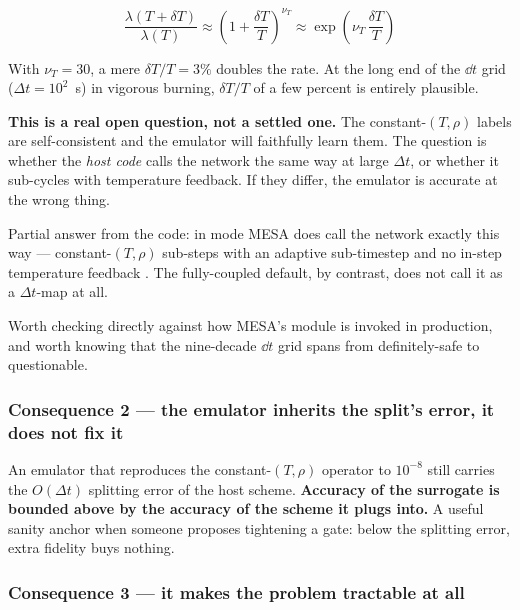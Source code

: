 \begin{equation*}
\frac{\lambda(T+\delta T)}{\lambda(T)}
  \approx \left(1 + \frac{\delta T}{T}\right)^{\!\nu_T}
  \approx \exp\!\left(\nu_T\,\frac{\delta T}{T}\right)
\end{equation*}

With $\nu_T = 30$, a mere $\delta T/T = 3\%$ doubles the rate. At the long end
of the $\dd t$ grid ($\Delta t = 10^{2}$~s) in vigorous burning, $\delta T/T$ of
a few percent is entirely plausible.

\begin{aside}
\textbf{This is a real open question, not a settled one.} The
constant-$(T,\rho)$ labels are self-consistent and the emulator will faithfully
learn them. The question is whether the \emph{host code} calls the network the
same way at large $\Delta t$, or whether it sub-cycles with temperature
feedback. If they differ, the emulator is accurate at the wrong thing.

Partial answer from the code: in  mode MESA does call the
network exactly this way --- constant-$(T,\rho)$ sub-steps with an adaptive
sub-timestep and no in-step temperature feedback \citep{jermyn2023}. The
fully-coupled default, by contrast, does not call it as a $\Delta t$-map at all.
\end{aside}

Worth checking directly against how MESA's  module is invoked in
production, and worth knowing that the nine-decade $\dd t$ grid spans from
definitely-safe to questionable.

\subsubsection{Consequence 2 --- the emulator inherits the split's error, it does not
  fix it}
\label{sec:splitconsequence2}

An emulator that reproduces the constant-$(T,\rho)$ operator to $10^{-8}$ still
carries the $O(\Delta t)$ splitting error of the host scheme. \textbf{Accuracy
of the surrogate is bounded above by the accuracy of the scheme it plugs into.}
A useful sanity anchor when someone proposes tightening a gate: below the
splitting error, extra fidelity buys nothing.

\subsubsection{Consequence 3 --- it makes the problem tractable at all}
\label{sec:splitconsequence3}


